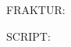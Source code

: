 \documentclass[crop=false,preview=false]{standalone}
\begin{document}
\noindent
\begin{minipage}[c][\textheight][c]{\textwidth}
\centering
\begin{minipage}{10cm}
\setlength{\parindent}{2em}

\noindent
{\regular \scriptsize FRAKTUR:}

{\fraktur \lipsum[1][1-8]}

\vspace{1cm}

\noindent
{\regular \scriptsize SCRIPT:}

{\script \lipsum[1][1-8]}
\end{minipage}
\end{minipage}
\end{document}
